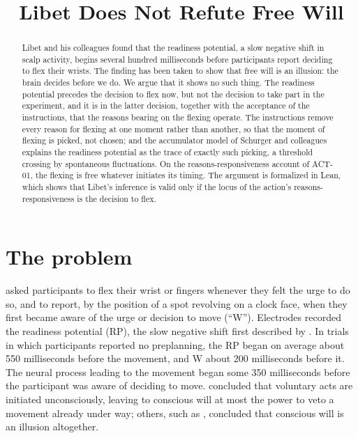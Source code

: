 \documentclass{situationist-preprint}
\title{Libet Does Not Refute Free Will}
\begin{document}
\maketitle

\begin{abstract}
Libet and his colleagues found that the readiness potential, a slow negative shift in scalp activity, begins several hundred milliseconds before participants report deciding to flex their wrists. The finding has been taken to show that free will is an illusion: the brain decides before we do. We argue that it shows no such thing. The readiness potential precedes the decision to flex now, but not the decision to take part in the experiment, and it is in the latter decision, together with the acceptance of the instructions, that the reasons bearing on the flexing operate. The instructions remove every reason for flexing at one moment rather than another, so that the moment of flexing is picked, not chosen; and the accumulator model of Schurger and colleagues explains the readiness potential as the trace of exactly such picking, a threshold crossing by spontaneous fluctuations. On the reasons-responsiveness account of ACT-01, the flexing is free whatever initiates its timing. The argument is formalized in Lean, which shows that Libet's inference is valid only if the locus of the action's reasons-responsiveness is the decision to flex.
\end{abstract}

\section{The problem}

\citet{Libet1983} asked participants to flex their wrist or fingers whenever they felt the urge to do so, and to report, by the position of a spot revolving on a clock face, when they first became aware of the urge or decision to move (\enquote{W}). Electrodes recorded the readiness potential (RP), the slow negative shift first described by \citet{KornhuberDeecke1965}. In trials in which participants reported no preplanning, the RP began on average about 550 milliseconds before the movement, and W about 200 milliseconds before it. The neural process leading to the movement began some 350 milliseconds before the participant was aware of deciding to move. \citet{Libet1985} concluded that voluntary acts are initiated unconsciously, leaving to conscious will at most the power to veto a movement already under way; others, such as \citet{Wegner2002}, concluded that conscious will is an illusion altogether.
\end{document}
